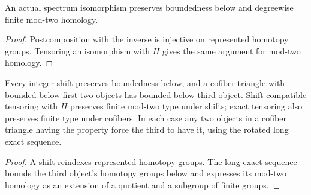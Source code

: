 \begin{proposition}
  \label{prop:bounded-finite-type-iso}
  \leanok
  An actual spectrum isomorphism preserves boundedness below and
  degreewise finite mod-two homology.
\end{proposition}
\begin{proof}
  Postcomposition with the inverse is injective on represented homotopy
  groups. Tensoring an isomorphism with $H$ gives the same argument for
  mod-two homology.
  \leanok
\end{proof}

\begin{proposition}
  \label{prop:bounded-finite-type-closure}
  \leanok
  Every integer shift preserves boundedness below, and a cofiber triangle
  with bounded-below first two objects has bounded-below third object.
  Shift-compatible tensoring with $H$ preserves finite mod-two type under
  shifts; exact tensoring also preserves finite type under cofibers.
  In each case any two objects in a cofiber triangle having the property
  force the third to have it, using the rotated long exact sequence.
\end{proposition}
\begin{proof}
  A shift reindexes represented homotopy groups. The long exact sequence
  bounds the third object's homotopy groups below and expresses its
  mod-two homology as an extension of a quotient and a subgroup of finite
  groups.
  \leanok
\end{proof}

